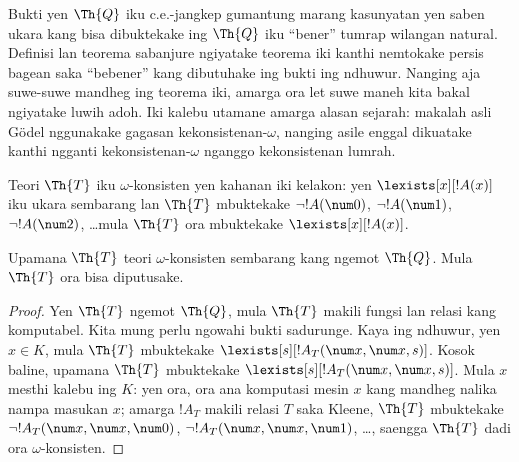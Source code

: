 \documentclass[../../../include/open-logic-section]{subfiles}
\begin{document}


\begin{explain}
Bukti yen $\Th{Q}$ iku c.e.-jangkep gumantung marang kasunyatan yen saben
ukara kang bisa dibuktekake ing $\Th{Q}$ iku ``bener'' tumrap wilangan natural.
Definisi lan teorema sabanjure ngiyatake teorema iki kanthi nemtokake
persis bagean saka ``bebener'' kang dibutuhake ing bukti ing
ndhuwur. Nanging aja suwe-suwe mandheg ing teorema iki, amarga ora
let suwe maneh kita bakal ngiyatake luwih adoh. Iki kalebu utamane
amarga alasan sejarah: makalah asli G\"odel nggunakake gagasan
kekonsistenan-$\omega$, nanging asile enggal dikuatake kanthi ngganti
kekonsistenan-$\omega$ nganggo kekonsistenan lumrah.
\end{explain}

\begin{defn}
Teori $\Th{T}$ iku $\omega$-konsisten yen kahanan iki kelakon: yen
$\lexists[x][!A(x)]$ iku ukara sembarang lan $\Th{T}$ mbuktekake $\lnot
!A(\num 0)$, $\lnot !A(\num 1)$, $\lnot !A(\num 2)$, \dots mula $\Th{T}$
ora mbuktekake $\lexists[x][!A(x)]$.
\end{defn}

\begin{thm}
  Upamana $\Th{T}$ teori $\omega$-konsisten sembarang kang ngemot $\Th{Q}$.
  Mula $\Th{T}$ ora bisa diputusake.
\end{thm}

\begin{proof}
Yen $\Th{T}$ ngemot $\Th{Q}$, mula $\Th{T}$ makili fungsi
lan relasi kang komputabel. Kita mung perlu ngowahi bukti sadurunge.
Kaya ing ndhuwur, yen $x \in K$, mula $\Th{T}$ mbuktekake $\lexists[s][!A_T(\num
  x,\num x, s)]$. Kosok baline, upamana $\Th{T}$ mbuktekake
$\lexists[s][!A_T(\num x, \num x, s)]$. Mula $x$ mesthi kalebu ing $K$:
yen ora, ora ana komputasi mesin $x$ kang mandheg nalika nampa masukan
$x$; amarga $!A_T$ makili relasi $T$ saka Kleene, $\Th{T}$
mbuktekake $\lnot !A_T(\num x, \num x, \num 0)$, $\lnot !A_T(\num x, \num
x, \num 1)$, \dots, saengga $\Th{T}$ dadi ora $\omega$-konsisten.
\end{proof}
\end{document}
